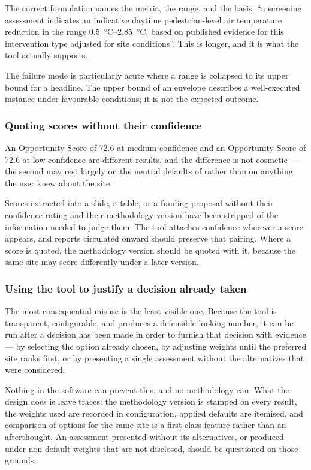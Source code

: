 The correct formulation names the metric, the range, and the basis: ``a
screening assessment indicates an indicative daytime pedestrian-level air
temperature reduction in the range \qtyrange{0.5}{2.85}{\degreeCelsius}, based
on published evidence for this intervention type adjusted for site
conditions''. This is longer, and it is what the tool actually supports.

The failure mode is particularly acute where a range is collapsed to its upper
bound for a headline. The upper bound of an envelope describes a well-executed
instance under favourable conditions; it is not the expected outcome.

\subsubsection{Quoting scores without their confidence}

An Opportunity Score of 72.6 at medium confidence and an Opportunity Score of
72.6 at low confidence are different results, and the difference is not
cosmetic --- the second may rest largely on the neutral defaults of
 rather than on anything the user knew about the site.

Scores extracted into a slide, a table, or a funding proposal without their
confidence rating and their methodology version have been stripped of the
information needed to judge them. The tool attaches confidence wherever a score
appears, and reports circulated onward should preserve that pairing. Where a
score is quoted, the methodology version should be quoted with it, because the
same site may score differently under a later version.

\subsubsection{Using the tool to justify a decision already taken}

The most consequential misuse is the least visible one. Because the tool is
transparent, configurable, and produces a defensible-looking number, it can be
run after a decision has been made in order to furnish that decision with
evidence --- by selecting the option already chosen, by adjusting weights until
the preferred site ranks first, or by presenting a single assessment without
the alternatives that were considered.

Nothing in the software can prevent this, and no methodology can. What the
design does is leave traces: the methodology version is stamped on every
result, the weights used are recorded in configuration, applied defaults are
itemised, and comparison of options for the same site is a first-class feature
rather than an afterthought. An assessment presented without its alternatives,
or produced under non-default weights that are not disclosed, should be
questioned on those grounds.

